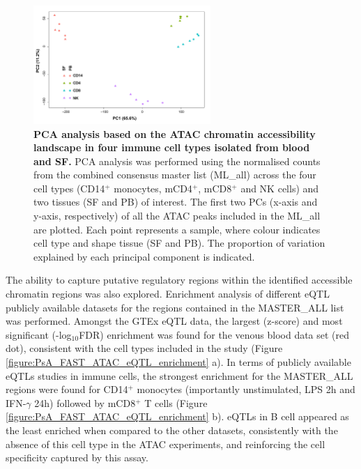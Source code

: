 \begin{figure}[H]
\centering
\includegraphics[width=0.6\textwidth]{./Results3/pdfs/ATAC_PSA_all_DESEq2_PCA}
\caption[PCA analysis based on the ATAC chromatin accessibility landscape in four immune cell types isolated from blood and SF.]{\textbf{PCA analysis based on the ATAC chromatin accessibility landscape in four immune cell types isolated from blood and SF.} PCA analysis was performed using the normalised counts from the combined consensus master list (ML\_all) across the four cell types (CD14$^+$ monocytes, mCD4$^+$, mCD8$^+$ and NK cells) and two tissues (SF and PB) of interest. The first two PCs (x-axis and y-axis, respectively) of all the ATAC peaks included in the ML\_all are plotted. Each point represents a sample, where colour indicates cell type and shape tissue (SF and PB). The proportion of variation explained by each principal component is indicated.}
\label{figure:Core_ATAC_all_conditions_PCA}
\label{figure:PsA_FAST_ATAC_PCA}
\end{figure}



The ability to capture putative regulatory regions within the identified accessible chromatin regions was also explored. Enrichment analysis of different eQTL publicly available datasets for the regions contained in the MASTER\_ALL list was performed. Amongst the GTEx eQTL data, the largest (z-score) and most significant (-log$_10$FDR) enrichment was found for the venous blood data set (red dot), consistent with the cell types included in the study (Figure \ref{figure:PsA_FAST_ATAC_eQTL_enrichment} a). In terms of publicly available eQTLs studies in immune cells, the strongest enrichment for the MASTER\_ALL regions were found for CD14$^+$ monocytes (importantly unstimulated, LPS 2h and IFN-$\gamma$ 24h) followed by mCD8$^+$ T cells (Figure \ref{figure:PsA_FAST_ATAC_eQTL_enrichment} b). eQTLs in B cell appeared as the least enriched when compared to the other datasets, consistently with the absence of this cell type in the ATAC experiments, and reinforcing the cell specificity captured by this assay.

